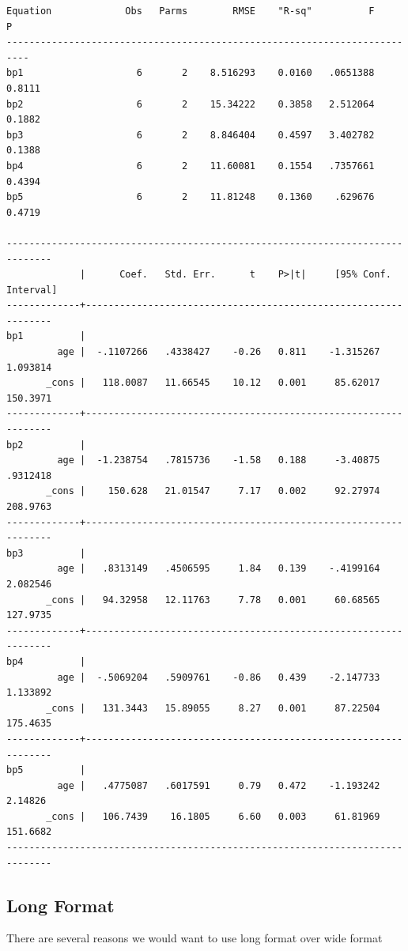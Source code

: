\documentclass[
]{book}
\begin{document}
\begin{verbatim}
Equation             Obs   Parms        RMSE    "R-sq"          F        P
--------------------------------------------------------------------------
bp1                    6       2    8.516293    0.0160   .0651388   0.8111
bp2                    6       2    15.34222    0.3858   2.512064   0.1882
bp3                    6       2    8.846404    0.4597   3.402782   0.1388
bp4                    6       2    11.60081    0.1554   .7357661   0.4394
bp5                    6       2    11.81248    0.1360    .629676   0.4719

------------------------------------------------------------------------------
             |      Coef.   Std. Err.      t    P>|t|     [95% Conf. Interval]
-------------+----------------------------------------------------------------
bp1          |
         age |  -.1107266   .4338427    -0.26   0.811    -1.315267    1.093814
       _cons |   118.0087   11.66545    10.12   0.001     85.62017    150.3971
-------------+----------------------------------------------------------------
bp2          |
         age |  -1.238754   .7815736    -1.58   0.188     -3.40875    .9312418
       _cons |    150.628   21.01547     7.17   0.002     92.27974    208.9763
-------------+----------------------------------------------------------------
bp3          |
         age |   .8313149   .4506595     1.84   0.139    -.4199164    2.082546
       _cons |   94.32958   12.11763     7.78   0.001     60.68565    127.9735
-------------+----------------------------------------------------------------
bp4          |
         age |  -.5069204   .5909761    -0.86   0.439    -2.147733    1.133892
       _cons |   131.3443   15.89055     8.27   0.001     87.22504    175.4635
-------------+----------------------------------------------------------------
bp5          |
         age |   .4775087   .6017591     0.79   0.472    -1.193242     2.14826
       _cons |   106.7439    16.1805     6.60   0.003     61.81969    151.6682
------------------------------------------------------------------------------
\end{verbatim}

\subsection*{Long Format}\label{long-format-1}

There are several reasons we would want to use long format over wide format
\end{document}
